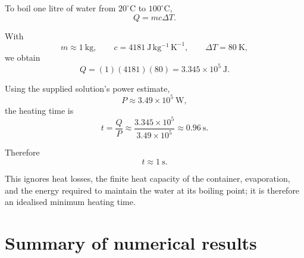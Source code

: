 \documentclass[11pt,a4paper]{article}
\begin{document}
To boil one litre of water from $20^\circ\mathrm C$ to $100^\circ\mathrm C$,
\[
Q=mc\Delta T.
\]

With
\[
m\approx1\ \mathrm{kg},
\qquad
c=4181\ \mathrm{J\,kg^{-1}\,K^{-1}},
\qquad
\Delta T=80\ \mathrm K,
\]
we obtain
\[
Q
=
(1)(4181)(80)
=
3.345\times10^5\ \mathrm J.
\]

Using the supplied solution's power estimate,
\[
P\approx3.49\times10^5\ \mathrm W,
\]
the heating time is
\[
t=\frac QP
\approx
\frac{3.345\times10^5}{3.49\times10^5}
\approx0.96\ \mathrm s.
\]

Therefore
\[
\boxed{t\approx1\ \mathrm s}.
\]

This ignores heat losses, the finite heat capacity of the container, evaporation,
and the energy required to maintain the water at its boiling point; it is therefore
an idealised minimum heating time.

\section*{Summary of numerical results}
\end{document}

